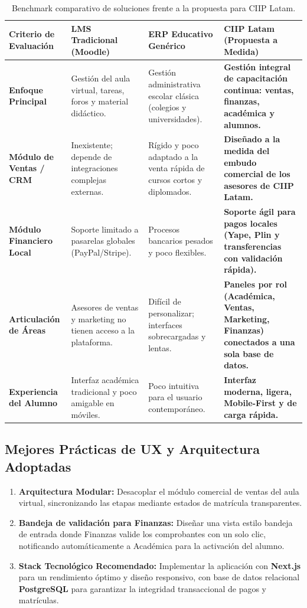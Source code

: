\documentclass[11pt,a4paper]{article}
\begin{document}
\begin{table}[H]
    \centering
    \small
    \begin{tabularx}{\textwidth}{@{}p{3.2cm}p{3.5cm}p{3.5cm}X@{}}
        \toprule
        \textbf{Criterio de Evaluación} & \textbf{LMS Tradicional (Moodle)} & \textbf{ERP Educativo Genérico} & \textbf{CIIP Latam (Propuesta a Medida)} \\
        \midrule
        \textbf{Enfoque Principal} & Gestión del aula virtual, tareas, foros y material didáctico. & Gestión administrativa escolar clásica (colegios y universidades). & \textbf{Gestión integral de capacitación continua: ventas, finanzas, académica y alumnos.} \\
        \midrule
        \textbf{Módulo de Ventas / CRM} & Inexistente; depende de integraciones complejas externas. & Rígido y poco adaptado a la venta rápida de cursos cortos y diplomados. & \textbf{Diseñado a la medida del embudo comercial de los asesores de CIIP Latam.} \\
        \midrule
        \textbf{Módulo Financiero Local} & Soporte limitado a pasarelas globales (PayPal/Stripe). & Procesos bancarios pesados y poco flexibles. & \textbf{Soporte ágil para pagos locales (Yape, Plin y transferencias con validación rápida).} \\
        \midrule
        \textbf{Articulación de Áreas} & Asesores de ventas y marketing no tienen acceso a la plataforma. & Difícil de personalizar; interfaces sobrecargadas y lentas. & \textbf{Paneles por rol (Académica, Ventas, Marketing, Finanzas) conectados a una sola base de datos.} \\
        \midrule
        \textbf{Experiencia del Alumno} & Interfaz académica tradicional y poco amigable en móviles. & Poco intuitiva para el usuario contemporáneo. & \textbf{Interfaz moderna, ligera, Mobile-First y de carga rápida.} \\
        \bottomrule
    \end{tabularx}
    \caption{Benchmark comparativo de soluciones frente a la propuesta para CIIP Latam.}
\end{table}

\subsection{Mejores Prácticas de UX y Arquitectura Adoptadas}
\begin{enumerate}
    \item \textbf{Arquitectura Modular:} Desacoplar el módulo comercial de ventas del aula virtual, sincronizando las etapas mediante estados de matrícula transparentes.
    \item \textbf{Bandeja de validación para Finanzas:} Diseñar una vista estilo bandeja de entrada donde Finanzas valide los comprobantes con un solo clic, notificando automáticamente a Académica para la activación del alumno.
    \item \textbf{Stack Tecnológico Recomendado:} Implementar la aplicación con \textbf{Next.js} para un rendimiento óptimo y diseño responsivo, con base de datos relacional \textbf{PostgreSQL} para garantizar la integridad transaccional de pagos y matrículas.
\end{enumerate}
\end{document}

